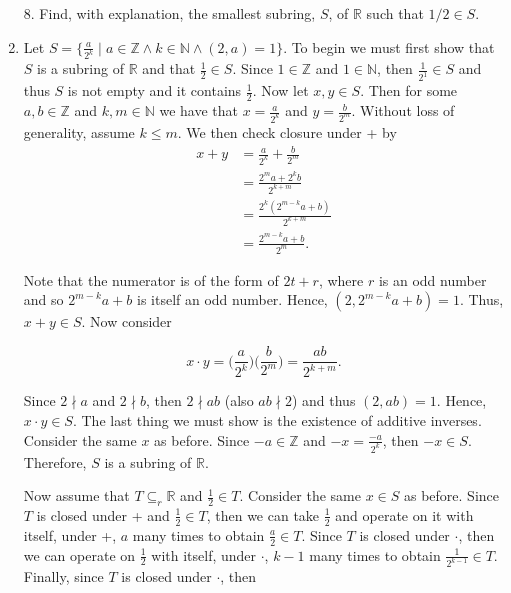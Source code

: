 \documentclass[12pt]{article}
\makeatletter
\theoremstyle{definition}
\theoremstyle{remark}
\renewenvironment{proof}[1][\proofname]{\par
  \pushQED{\qed}%
  \normalfont \topsep6\p@\@plus6\p@\relax
  \list{}{\leftmargin=0mm
          \rightmargin=4mm
          \settowidth{\itemindent}{\itshape#1}%
          \labelwidth=\itemindent
          \parsep=0pt \listparindent=\parindent 
  }
  \item[\hskip\labelsep
        \itshape
    #1\@addpunct{.}]\ignorespaces
}{%
  \popQED\endlist\@endpefalse
}
\let\oldproofname=\proofname
\renewcommand{\proofname}{\bf{\textit{\oldproofname}}}
\makeatother
\begin{document}
\begin{enumerate}[leftmargin=*]
        \item[8.] Find, with explanation, the smallest subring, $S$, of $\mathbb{R}$ such that $1/2\in S$. 
            \begin{proof}
                Let $S=\{\frac{a}{2^k}\mid a\in\mathbb{Z}\wedge k\in\mathbb{N}\wedge (2,a)=1\}$. To begin we must first show that $S$ is a subring of $\mathbb{R}$ and that $\frac{1}{2}\in S$. Since $1\in\mathbb{Z}$ and $1\in\mathbb{N}$, then $\frac{1}{2^1}\in S$ and thus $S$ is not empty and it contains $\frac{1}{2}$. Now let $x,y\in S$. Then for some $a,b\in\mathbb{Z}$ and $k,m\in\mathbb{N}$ we have that $x=\frac{a}{2^k}$ and $y=\frac{b}{2^m}$. Without loss of generality, assume $k\leq m$. We then check closure under + by 
                    \begin{equation*}
                        \begin{split}
                            x+y &= \frac{a}{2^k}+\frac{b}{2^m} \\
                            &= \frac{2^ma+2^kb}{2^{k+m}} \\
                            &= \frac{2^k(2^{m-k}a+b)}{2^{k+m}} \\ 
                            &= \frac{2^{m-k}a+b}{2^m}.
                        \end{split}
                    \end{equation*}
                    
                Note that the numerator is of the form of $2t+r$, where $r$ is an odd number and so $2^{m-k}a+b$ is itself an odd number. Hence, $(2,2^{m-k}a+b)=1$. Thus, $x+y\in S$. Now consider
                
                    \begin{equation*}
                        x\cdot y = \bigg(\frac{a}{2^k}\bigg)\bigg(\frac{b}{2^m}\bigg) 
                            = \frac{ab}{2^{k+m}}.
                    \end{equation*}
                    
                Since $2\nmid a$ and $2\nmid b$, then $2\nmid ab$ (also $ab\nmid 2$) and thus $(2,ab)=1$. Hence, $x\cdot y\in S$. The last thing we must show is the existence of additive inverses. Consider the same $x$ as before. Since $-a\in\mathbb{Z}$ and $-x=\frac{-a}{2^k}$, then $-x\in S$. Therefore, $S$ is a subring of $\mathbb{R}$.\par\hspace{4mm} Now assume that $T\subseteq_r\mathbb{R}$ and $\frac{1}{2}\in T$. Consider the same $x\in S$ as before. Since $T$ is closed under + and $\frac{1}{2}\in T$, then we can take $\frac{1}{2}$ and operate on it with itself, under +, $a$ many times to obtain $\frac{a}{2}\in T$. Since $T$ is closed under $\cdot$, then we can operate on $\frac{1}{2}$ with itself, under $\cdot$, $k-1$ many times to obtain $\frac{1}{2^{k-1}}\in T$. Finally, since $T$ is closed under $\cdot$, then 
                

\end{proof}
\end{enumerate}
\end{document}
